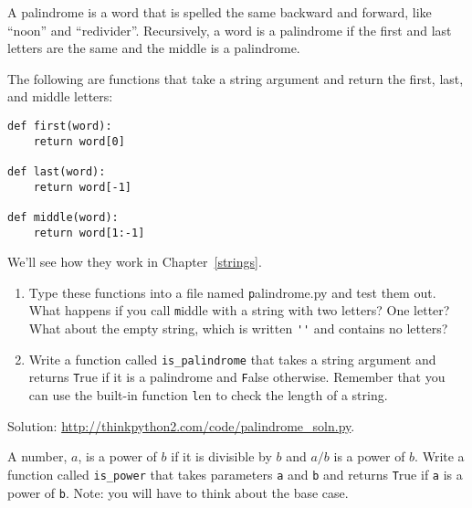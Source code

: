 \documentclass[
DIV=11,
fontsize=13,
twoside,
headinclude=false,
titlepage=firstiscover,
abstract=true,
headsepline=true,
footsepline=true,
chapterprefix=true, %
headings=big,
bibliography=totoc,%
captions=tableheading
]{scrbook}
\theoremstyle{definition}
\begin{document}
\begin{exercise}
\normalfont
\label{palindrome}

A palindrome is a word that is spelled the same backward and
forward, like ``noon'' and ``redivider''.  Recursively, a word
is a palindrome if the first and last letters are the same
and the middle is a palindrome.

The following are functions that take a string argument and
return the first, last, and middle letters:

\begin{lstlisting}
def first(word):
    return word[0]

def last(word):
    return word[-1]

def middle(word):
    return word[1:-1]
\end{lstlisting}
%
We'll see how they work in Chapter~\ref{strings}.

\begin{enumerate}

\item Type these functions into a file named {\texttt palindrome.py}
and test them out.  What happens if you call {\texttt middle} with
a string with two letters?  One letter?  What about the empty
string, which is written \verb"''" and contains no letters?

\item Write a function called \verb"is_palindrome" that takes
a string argument and returns {\texttt True} if it is a palindrome
and {\texttt False} otherwise.  Remember that you can use the
built-in function {\texttt len} to check the length of a string.

\end{enumerate}

Solution: \url{http://thinkpython2.com/code/palindrome_soln.py}.

\end{exercise}

\begin{exercise}
\normalfont

A number, $a$, is a power of $b$ if it is divisible by $b$
and $a/b$ is a power of $b$.  Write a function called
\verb"is_power" that takes parameters {\texttt a} and {\texttt b}
and returns {\texttt True} if {\texttt a} is a power of {\texttt b}.
Note: you will have to think about the base case.

\end{exercise}
\end{document}
